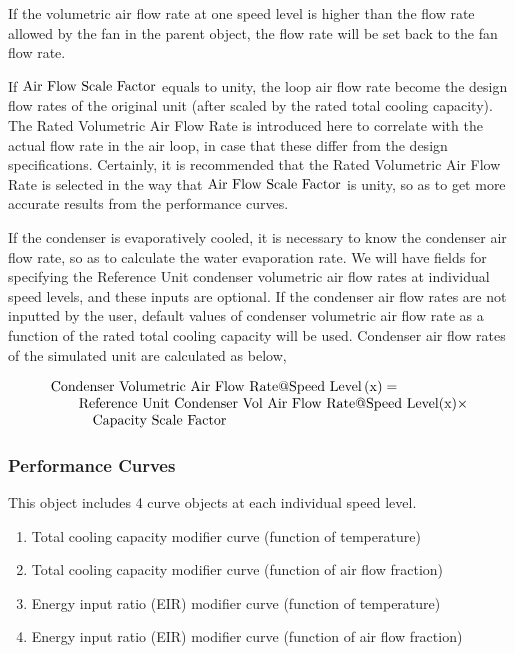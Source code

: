 If the volumetric air flow rate at one speed level is higher than the flow rate allowed by the fan in the parent object, the flow rate will be set back to the fan flow rate.

If \({\rm{Air~Flow~Scale~Factor}}\) equals to unity, the loop air flow rate become the design flow rates of the original unit (after scaled by the rated total cooling capacity). The Rated Volumetric Air Flow Rate is introduced here to correlate with the actual flow rate in the air loop, in case that these differ from the design specifications. Certainly, it is recommended that the Rated Volumetric Air Flow Rate is selected in the way that \({\rm{Air~Flow~Scale~Factor}}\) is unity, so as to get more accurate results from the performance curves.

If the condenser is evaporatively cooled, it is necessary to know the condenser air flow rate, so as to calculate the water evaporation rate. We will have fields for specifying the Reference Unit condenser volumetric air flow rates at individual speed levels, and these inputs are optional. If the condenser air flow rates are not inputted by the user, default values of condenser volumetric air flow rate as a function of the rated total cooling capacity will be used. Condenser air flow rates of the simulated unit are calculated as below,

\begin{equation}
  \begin{array}{l}
    \rm{Condenser~Volumetric~Air~Flow~Rate} @ \rm{Speed~Level} \left( {\rm{x}} \right) = \\
    \quad \quad \rm{Reference~Unit~Condenser~Vol~Air~Flow~Rate} @ \rm{Speed~Level} (\rm{x}) \times \\
    \quad \quad \quad \rm{Capacity~Scale~Factor}
  \end{array}
\end{equation}

\subsubsection{Performance Curves}\label{performance-curves}

This object includes 4 curve objects at each individual speed level.

\begin{enumerate}
\def\labelenumi{\arabic{enumi})}
\tightlist
\item Total cooling capacity modifier curve (function of temperature)
\item Total cooling capacity modifier curve (function of air flow fraction)
\item Energy input ratio (EIR) modifier curve (function of temperature)
\item Energy input ratio (EIR) modifier curve (function of air flow fraction)
\end{enumerate}

